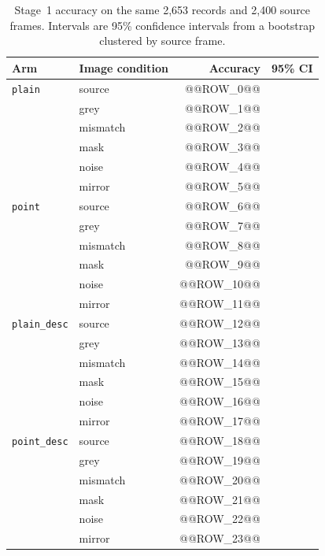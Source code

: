 \begin{table}[ht]
\centering
\caption[Stage~1 accuracy by image condition]{Stage~1 accuracy on the same
2,653 records and 2,400 source frames. Intervals are 95\% confidence intervals
from a bootstrap clustered by source frame.}
\label{tab:rq1-battery}
\begin{tabular}{llrr}
\toprule
Arm & Image condition & Accuracy & 95\% CI \\
\midrule
\texttt{plain} & source & @@ROW_0@@ \\
 & grey & @@ROW_1@@ \\
 & mismatch & @@ROW_2@@ \\
 & mask & @@ROW_3@@ \\
 & noise & @@ROW_4@@ \\
 & mirror & @@ROW_5@@ \\
\texttt{point} & source & @@ROW_6@@ \\
 & grey & @@ROW_7@@ \\
 & mismatch & @@ROW_8@@ \\
 & mask & @@ROW_9@@ \\
 & noise & @@ROW_10@@ \\
 & mirror & @@ROW_11@@ \\
\texttt{plain\_desc} & source & @@ROW_12@@ \\
 & grey & @@ROW_13@@ \\
 & mismatch & @@ROW_14@@ \\
 & mask & @@ROW_15@@ \\
 & noise & @@ROW_16@@ \\
 & mirror & @@ROW_17@@ \\
\texttt{point\_desc} & source & @@ROW_18@@ \\
 & grey & @@ROW_19@@ \\
 & mismatch & @@ROW_20@@ \\
 & mask & @@ROW_21@@ \\
 & noise & @@ROW_22@@ \\
 & mirror & @@ROW_23@@ \\
\bottomrule
\end{tabular}
\end{table}

